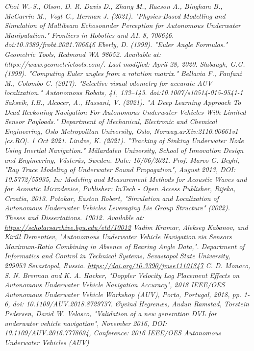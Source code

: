 \documentclass[]{article}
\begin{document}
\begin{thebibliography}{2}
	\bibitem[13]{} \textit{Choi W.-S., Olson, D. R. Davis D., Zhang M., Racson A., Bingham B., McCarrin M., Vogt C., Herman J. (2021). "Physics-Based Modelling and Simulation of Multibeam Echosounder Perception for Autonomous Underwater Manipulation." Frontiers in Robotics and AI, 8, 706646. doi:10.3389/frobt.2021.706646}
	\bibitem[14]{} \textit{Eberly, D. (1999). "Euler Angle Formulas." Geometric Tools, Redmond WA 98052. Available at: https://www.geometrictools.com/. Last modified: April 28, 2020.}
	\bibitem[15]{} \textit{Slabaugh, G.G. (1999). "Computing Euler angles from a rotation matrix."}
	\bibitem[16]{} \textit{Bellavia F., Fanfani M., Colombo C. (2017). "Selective visual odometry for accurate AUV localization." Autonomous Robots, 41, 133–143. doi:10.1007/s10514-015-9541-1}
	\bibitem[17]{} \textit{Saksvik, I.B., Alcocer, A., Hassani, V. (2021). "A Deep Learning Approach To Dead-Reckoning Navigation For Autonomous Underwater Vehicles With Limited Sensor Payloads." Department of Mechanical, Electronic and Chemical Engineering, Oslo Metropolitan University, Oslo, Norway.arXiv:2110.00661v1 [cs.RO]. 1 Oct 2021.} 
	\bibitem[18]{} \textit{Lindve, K. (2021). "Tracking of Sinking Underwater Node Using Inertial Navigation." Mälardalen University, School of Innovation Design and Engineering, Västerås, Sweden. Date: 16/06/2021.}
	\bibitem[19]{}\textit{Prof. Marco G. Beghi, "Ray Trace Modeling of Underwater Sound Propagation", August 2013, DOI: 10.5772/55935, In: Modeling and Measurement Methods for Acoustic Waves and for Acoustic Microdevice, Publisher: InTech - Open Access Publisher, Rijeka, Croatia, 2013.}
	\bibitem[20]{} \textit{Potokar, Easton Robert, "Simulation and Localization of Autonomous Underwater Vehicles Leveraging Lie Group Structure" (2022). Theses and Dissertations. 10012. Available at: \url{https://scholarsarchive.byu.edu/etd/10012}}
	\bibitem[21]{} \textit {Vadim Kramar, Aleksey Kabanov, and Kirill Dementiev, "Autonomous Underwater Vehicle Navigation via Sensors Maximum-Ratio Combining in Absence of Bearing Angle Data,". Department of Informatics and Control in Technical Systems, Sevastopol State University, 299053 Sevastopol, Russia. \url{https://doi.org/10.3390/jmse11101847}}
	\bibitem[22]{} \textit{C. D. Monaco, S. N. Brennan and K. A. Hacker, "Doppler Velocity Log Placement Effects on Autonomous Underwater Vehicle Navigation Accuracy", 2018 IEEE/OES Autonomous Underwater Vehicle Workshop (AUV), Porto, Portugal, 2018, pp. 1-6, doi: 10.1109/AUV.2018.8729737.}
	\bibitem[23]{} \textit{Øyvind Hegrenæs, Audun Ramstad, Torstein Pedersen, David W. Velasco, "Validation of a new generation DVL for underwater vehicle navigation", November 2016, DOI: 10.1109/AUV.2016.7778694, Conference: 2016 IEEE/OES Autonomous Underwater Vehicles (AUV)}

\end{thebibliography}
\end{document}
